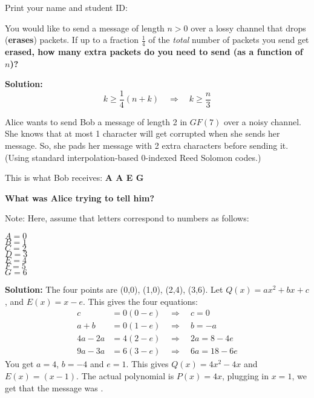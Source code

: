 \documentclass[11pt,fleqn]{article}
\newcommand{\fillin}[1]{\underline{\hskip #1}}
\newcommand{\startnewpage}{\newpage \noindent \vspace{0mm} {\sc Print} your name and student ID: \fillin{5in}\\[-0.2in]}
\renewcommand{\answer}[1]{{\color{mydarkblue}\textbf{Solution: }#1}}
\begin{document}
\begin{qunlist}

\startnewpage
{} 

You would like to send a message of length $n>0$ over a lossy
channel that drops ({\bf erases}) packets. If up to a fraction
$\frac{1}{4}$ of the {\em total} number of packets you send get {\bf
  erased, how many extra packets do you need to send (as a function of
  $n$)?} 

\answer{
\[ k \geq \frac{1}{4}(n+k) \quad \Rightarrow \quad \boxed{k \geq \frac{n}{3}} \]
}
\vspace{1in}


Alice wants to send Bob a message of length 2 in $GF(7)$ over a noisy channel.
She knows that at most 1 character will get corrupted when she sends
her message. So, she pads her message with 2 extra characters before
sending it. (Using standard interpolation-based $0$-indexed Reed
Solomon codes.)

This is what Bob receives: \textbf{A A E G}

{\bf What was Alice trying to tell him?}

Note: Here, assume that letters correspond to numbers as follows:

$A=0$ \\
$B=1$ \\
$C=2$ \\
$D=3$ \\
$E=4$ \\
$F=5$ \\
$G=6$




\answer{ The four points are (0,0), (1,0), (2,4), (3,6). Let $Q(x) = ax^2+bx+c$, and $E(x) = x-e$. This gives the four equations:
\begin{align*}
c & = 0(0-e) \quad \Rightarrow \quad c=0 \\
a+b & = 0(1-e) \quad \Rightarrow \quad b=-a \\
4a-2a & = 4(2-e) \quad \Rightarrow \quad 2a = 8-4e \\
9a-3a & = 6(3-e) \quad \Rightarrow \quad 6a = 18-6e
\end{align*}
You get $a = 4$, $b = -4$ and $e = 1$.
This gives $Q(x) = 4x^2 - 4x$ and $E(x) = (x-1)$.
The actual polynomial is $P(x) = 4x$, plugging in $x=1$, we get that the message was \boxed{\text{AE}}.
}



\end{qunlist}
\end{document}
